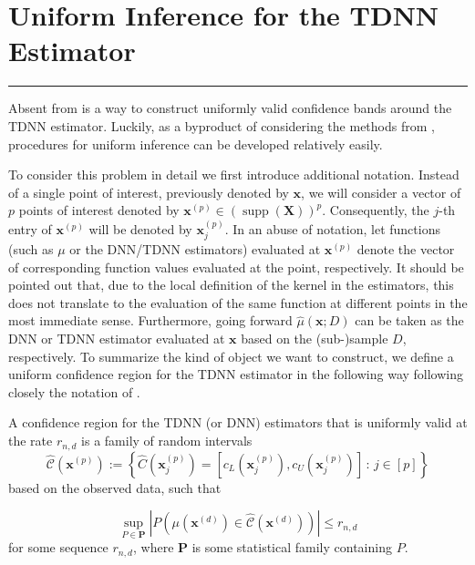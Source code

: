 \documentclass[letterpaper,10pt]{article}
\numberwithin{equation}{section}
\numberwithin{theorem}{section}
\numberwithin{remark}{section}
\numberwithin{example}{section}
\theoremstyle{definition}
\renewcommand{\hat}{\widehat}
\newcommand{\1}{\mathbb{1}}
\begin{document}
\newpage
\section{Uniform Inference for the TDNN Estimator}\label{UnifInf}
\hrule
Absent from \citet{demirkaya_optimal_2024} is a way to construct uniformly valid confidence bands around the TDNN estimator.
Luckily, as a byproduct of considering the methods from \citet{ritzwoller_uniform_2024}, procedures for uniform inference can be developed relatively easily.

To consider this problem in detail we first introduce additional notation.
Instead of a single point of interest, previously denoted by $\mathbf{x}$, we will consider a vector of $p$ points of interest denoted by $\mathbf{x}^{(p)} \in \left(\operatorname{supp}\left(\mathbf{X}\right)\right)^{p}$.
Consequently, the $j$-th entry of $\mathbf{x}^{(p)}$ will be denoted by $\mathbf{x}^{(p)}_{j}$.
In an abuse of notation, let functions (such as $\mu$ or the DNN/TDNN estimators) evaluated at $\mathbf{x}^{(p)}$ denote the vector of corresponding function values evaluated at the point, respectively.
It should be pointed out that, due to the local definition of the kernel in the estimators, this does not translate to the evaluation of the same function at different points in the most immediate sense.
Furthermore, going forward $\hat{\mu}\left(\mathbf{x}; D\right)$ can be taken as the DNN or TDNN estimator evaluated at $\mathbf{x}$ based on the (sub-)sample $D$, respectively.
To summarize the kind of object we want to construct, we define a uniform confidence region for the TDNN estimator in the following way following closely the notation of \citet{ritzwoller_uniform_2024}.

\vspace{0.5cm}
\begin{definition}
	A confidence region for the TDNN (or DNN) estimators that is uniformly valid at the rate $r_{n,d}$ is a family of random intervals
	\begin{equation}
		\hat{\mathcal{C}}\left(\mathbf{x}^{(p)}\right)
		:= \left\{\hat{C}(\mathbf{x}^{(p)}_{j}) = \left[c_{L}(\mathbf{x}^{(p)}_{j}), c_{U}(\mathbf{x}^{(p)}_{j})\right]\, : \, j \in [p]\right\}
	\end{equation}
	based on the observed data, such that

	\begin{equation}
		\sup_{P \in \mathbf{P}} \left| P\left(\mu(\mathbf{x}^{(d)}) \in \hat{\mathcal{C}}\left(\mathbf{x}^{(d)}\right)\right) \right| \leq r_{n,d}
	\end{equation}
	for some sequence $r_{n,d}$, where $\mathbf{P}$ is some statistical family containing $P$.
\end{definition}
\end{document}
